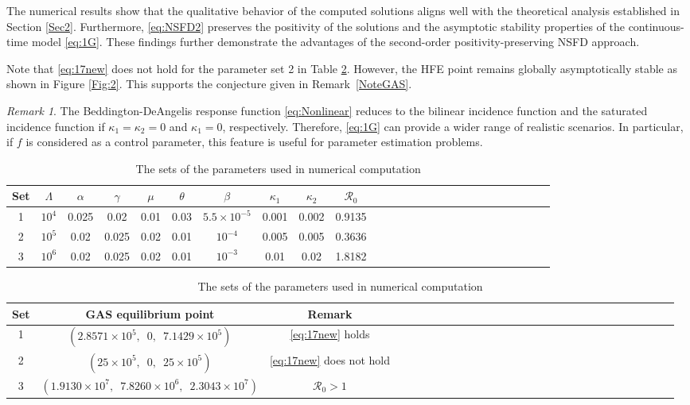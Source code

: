 \documentclass[11pt]{article}
\theoremstyle{definition}
\theoremstyle{remark}
\newtheorem{remark}[theorem]{Remark}
\numberwithin{equation}{section}
\begin{document}
The numerical results show that the qualitative behavior of the computed solutions aligns well with the theoretical analysis established in Section \ref{Sec2}. 
Furthermore, \eqref{eq:NSFD2} preserves the positivity of the solutions and the asymptotic stability properties of the continuous-time model \eqref{eq:1G}. 
These findings further demonstrate the advantages of the second-order positivity-preserving NSFD approach.

Note that \eqref{eq:17new} does not hold for the parameter set 2 in Table \ref{Table5}. 
However, the HFE point remains globally asymptotically stable as shown in Figure \ref{Fig:2}. This supports the conjecture given in Remark~\ref{NoteGAS}.

\begin{remark}
The Beddington-DeAngelis response function \eqref{eq:Nonlinear} reduces to the bilinear incidence function and the saturated incidence function if $\kappa_1 = \kappa_2 = 0$ and $\kappa_1 = 0$, respectively.
Therefore, \eqref{eq:1G} can provide a wider range of realistic scenarios. 
In particular, if $f$ is considered as a control parameter, this feature is useful for parameter estimation problems.
\end{remark}



\begin{table}[htb]
\centering
\caption{The sets of the parameters used in numerical computation}\label{Table5}
\begin{tabular}{cccccccccccccccccccccccccc}
\hline
Set& $\Lambda$ & $\alpha$ & $\gamma$ & $\mu$ & $\theta$  & $\beta$ & $\kappa_1$ & $\kappa_2$ & $\mathcal{R}_0$\\[2pt]
\hline
1& $10^4$ & 0.025 & 0.02 & 0.01 & 0.03 & $ 5.5 \times 10^{-5}$ & 0.001 & 0.002 & 0.9135 \\[2pt]
\hline
2 & $10^5$ & 0.02 & 0.025 & 0.02 & 0.01 & $10^{-4}$ & 0.005 & 0.005 & 0.3636\\[2pt]
\hline
3 & $10^6$ & 0.02 & 0.025 & 0.02 & 0.01 & $10^{-3}$ & 0.01 & 0.02 &  1.8182 \\[2pt]
\hline
\end{tabular}\vspace*{0.5cm}
\begin{tabular}{cccccccccccccccccccccccccccc}
\hline
Set&  GAS equilibrium point & Remark\\[2pt]
\hline
1&  $(2.8571 \times 10^5,\,\,\, 0,\,\,\, 7.1429 \times 10^5)$ & \eqref{eq:17new} holds\\[2pt]
\hline
2 & $(25 \times 10^5,\,\,\,0,\,\,\,25 \times 10^5)$&{\eqref{eq:17new} does not hold}\\[2pt]
\hline
3 &  $(1.9130 \times 10^7,\,\,\, 7.8260 \times 10^6,\,\,\,  2.3043 \times 10^7)$& $\mathcal{R}_0 > 1$\\[2pt]
\hline
\end{tabular}
\end{table}
\end{document}
